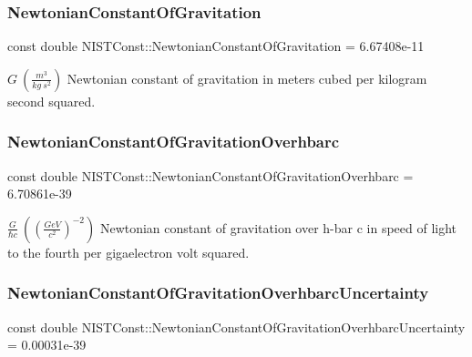 \subsubsection{\texorpdfstring{Newtonian\+Constant\+Of\+Gravitation}{NewtonianConstantOfGravitation}}
{\footnotesize\ttfamily const double N\+I\+S\+T\+Const\+::\+Newtonian\+Constant\+Of\+Gravitation = 6.\+67408e-\/11}

$G \ (\frac{m^3}{kg\ s^2})$ Newtonian constant of gravitation in meters cubed per kilogram second squared. \mbox{\label{group___n_i_s_t_const-_gravitational_constant_gad7c8d8ef09f60e8f3f36f86f98df0472}} 
\subsubsection{\texorpdfstring{Newtonian\+Constant\+Of\+Gravitation\+Overhbarc}{NewtonianConstantOfGravitationOverhbarc}}
{\footnotesize\ttfamily const double N\+I\+S\+T\+Const\+::\+Newtonian\+Constant\+Of\+Gravitation\+Overhbarc = 6.\+70861e-\/39}

$\frac{G}{\hbar c} \ ((\frac{GeV}{c^2})^{-2})$ Newtonian constant of gravitation over h-\/bar c in speed of light to the fourth per gigaelectron volt squared. \mbox{\label{group___n_i_s_t_const-_gravitational_constant_gaf10cbbd8ad1ece4ec01e35fe3d86854f}} 
\subsubsection{\texorpdfstring{Newtonian\+Constant\+Of\+Gravitation\+Overhbarc\+Uncertainty}{NewtonianConstantOfGravitationOverhbarcUncertainty}}
{\footnotesize\ttfamily const double N\+I\+S\+T\+Const\+::\+Newtonian\+Constant\+Of\+Gravitation\+Overhbarc\+Uncertainty = 0.\+00031e-\/39}

